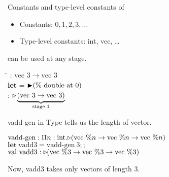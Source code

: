 \documentclass[dvipdfmx,aspectratio=169, 20pt]{beamer}
\begin{document}
\begin{frame}[fragile]{Constants and type-level constants of \LMD}
    \begin{itemize}
        \item Constants: \( 0,1,2,3,\dots \)
        \item Type-level constants: int, vec, \dots
    \end{itemize}
    can be used at any stage.
    \begin{exampleblock}{}
        \begin{tabbing}
            \hspace{5mm} \=  : \( \text{vec }3 \to \text{vec }3 \) \\[2mm]
            \> \textbf{let }  = \( {\mathop{\blacktriangleright}} (\%\ \text{double-at-0}) \) \\
            \>  : \( {\mathop{\triangleright}} \underbrace{(\text{vec }3 \to \text{vec }3)}_{\text{stage 1}} \)
        \end{tabbing}
    \end{exampleblock}
\end{frame}

\begin{frame}[fragile]{vadd-gen in \LMD}
    Type tells us the length of vector.
    \newcommand{\Vn}{\text{vec}\ \%n}
    \newcommand{\Vt}{\text{vec}\ \%3}
    \begin{exampleblock}{}
    \begin{tabbing}
        \hspace{5mm} \= \( \text{vadd-gen} : \Pi n:\text{int}. \TW (\Vn \to \Vn \to \Vn) \) \\[2mm]
        \> \( \textbf{let}\ \text{vadd3} = \text{vadd-gen}\ 3;; \) \\
        \> \( \text{val}\ \text{vadd3} : \TW (\Vt \to \Vt \to \Vt) \) \\[2mm]
    \end{tabbing}
    \end{exampleblock}
    Now, vadd3 takes only vectors of length 3.
\end{frame}
\end{document}
